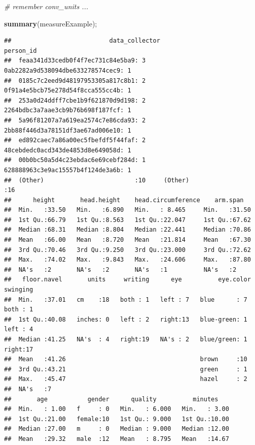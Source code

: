 \documentclass[]{article}
\newenvironment{Shaded}{\begin{snugshade}}{\end{snugshade}}
\newcommand{\CommentTok}[1]{\textcolor[rgb]{0.56,0.35,0.01}{\textit{#1}}}
\newcommand{\KeywordTok}[1]{\textcolor[rgb]{0.13,0.29,0.53}{\textbf{#1}}}
\newcommand{\NormalTok}[1]{#1}
\begin{document}
\begin{Shaded}
\begin{Highlighting}[]
\CommentTok{# remember conv_units ...}

\KeywordTok{summary}\NormalTok{(measureExample);}
\end{Highlighting}
\end{Shaded}

\begin{verbatim}
##                           data_collector                            person_id 
##  feaa341d33cedb0f4f7ec731c84e5ba9: 3     0ab2282a9d538094dbe633278574cec9: 1  
##  0185c7c2eed9d48197953305a817c8b1: 2     0f91a4e5bcb75e278d54f8cca555cc4b: 1  
##  253a0d24ddff7cbe1b9f621870d9d198: 2     2264bdbc3a7aae3cb9b76b698f187fcf: 1  
##  5a96f81207a7a619ea2574c7e86cda93: 2     2bb88f446d3a78151df3ae67ad006e10: 1  
##  ed892caec7a86a00ec5fbefdf5f44faf: 2     48cebdedc0acd343de4853d8e649058d: 1  
##  00b0bc50a5d4c23ebdac6e69cebf284d: 1     628888963c3e9ac15557b4f124de3a6b: 1  
##  (Other)                         :10     (Other)                         :16  
##      height       head.height    head.circumference    arm.span    
##  Min.   :33.50   Min.   :6.890   Min.   : 8.465     Min.   :31.50  
##  1st Qu.:66.79   1st Qu.:8.563   1st Qu.:22.047     1st Qu.:67.62  
##  Median :68.31   Median :8.804   Median :22.441     Median :70.86  
##  Mean   :66.00   Mean   :8.720   Mean   :21.814     Mean   :67.30  
##  3rd Qu.:70.46   3rd Qu.:9.250   3rd Qu.:23.000     3rd Qu.:72.62  
##  Max.   :74.02   Max.   :9.843   Max.   :24.606     Max.   :87.80  
##  NA's   :2       NA's   :2       NA's   :1          NA's   :2      
##   floor.navel       units     writing      eye          eye.color   swinging 
##  Min.   :37.01   cm    :18   both : 1   left : 7   blue      : 7   both : 1  
##  1st Qu.:40.08   inches: 0   left : 2   right:13   blue-green: 1   left : 4  
##  Median :41.25   NA's  : 4   right:19   NA's : 2   blue/green: 1   right:17  
##  Mean   :41.26                                     brown     :10             
##  3rd Qu.:43.21                                     green     : 1             
##  Max.   :45.47                                     hazel     : 2             
##  NA's   :7                                                                   
##       age           gender      quality          minutes     
##  Min.   : 1.00   f     : 0   Min.   : 6.000   Min.   : 3.00  
##  1st Qu.:21.00   female:10   1st Qu.: 9.000   1st Qu.:10.00  
##  Median :27.00   m     : 0   Median : 9.000   Median :12.00  
##  Mean   :29.32   male  :12   Mean   : 8.795   Mean   :14.67  

\end{verbatim}
\end{document}
